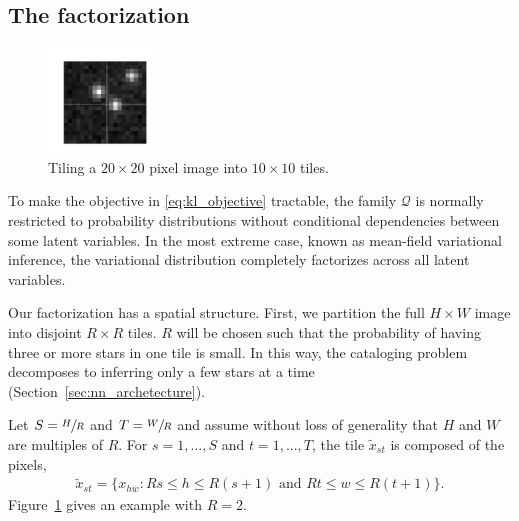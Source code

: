 \subsection{The factorization}
\label{sec:factorization}


\begin{figure}[tb]
    \centering
    \includegraphics[width = 0.25\textwidth]{figures/vi_figures/example_tiled_10.png}
    \caption{Tiling a $20 \times 20$ pixel image into $10 \times 10$ tiles.}
    \label{fig:ex_tiles}
\end{figure}

To make the objective in \eqref{eq:kl_objective} tractable, the family $\mathcal{Q}$ is normally restricted to probability distributions
without conditional dependencies between some latent variables. In the most extreme case, known as mean-field variational inference, the variational distribution completely factorizes across all latent variables.

Our factorization has a spatial structure.
First, we partition the full $H \times W$ image into disjoint $R \times R$ tiles.
$R$ will be chosen such that the probability of having three or more stars in one tile is small.
In this way, the cataloging problem decomposes to inferring only a few stars at a time (Section~\ref{sec:nn_archetecture}).


Let $S = \sfrac{H}{R}$ and $T = \sfrac{W}{R}$ and assume without loss of generality that $H$ and $W$ are multiples of $R$.
For $s = 1, ..., S$ and $t = 1, ..., T$,
the tile $\tilde x_{st}$ is composed of the pixels,
\begin{align}
    \tilde x_{st} = \{x_{hw} : Rs \leq h \leq R(s+1) \text{ and } Rt \leq w \leq R(t+1)\}.
    \label{eq:tiles}
\end{align}
Figure~\ref{fig:ex_tiles} gives an example with $R = 2$.

